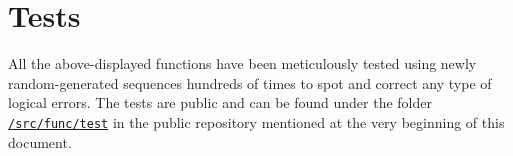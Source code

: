 \setcounter{secnumdepth}{0}
\vspace{40px} \section{Tests}
All the above-displayed functions have been meticulously tested using newly random-generated sequences hundreds of times to spot and correct any type of logical errors. The tests are public and can be found under the folder \href{https://github.com/imAlessas/transmission-simulation/tree/main/src/func/test}{\texttt{/src/func/test}} in the public repository mentioned at the very beginning of this document.



\setcounter{secnumdepth}{1}